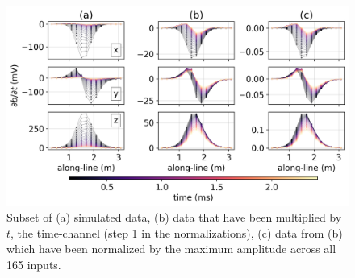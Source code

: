 \begin{figure}[htb]
    \begin{center}
    \includegraphics[width=\columnwidth]{figures/data_normalizations.png}
    \end{center}
\caption{
    Subset of (a) simulated data,
    (b) data that have been multiplied by $t$, the time-channel (step 1 in the normalizations),
    (c) data from (b) which have been normalized by the maximum amplitude across all 165 inputs.
}
\label{fig:data-normalizations}
\end{figure}

